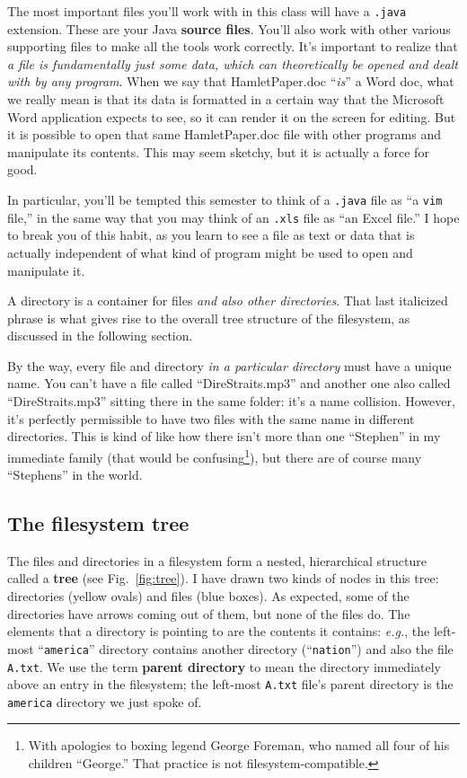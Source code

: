 The most important files you'll work with in this class will have a
\texttt{.java} extension. These are your Java \textbf{source files}. You'll
also work with other various supporting files to make all the tools work
correctly. It's important to realize that \textit{a file is fundamentally just
some data, which can theoretically be opened and dealt with by any program}.
When we say that HamletPaper.doc ``\textit{is}'' a Word doc, what we really
mean is that its data is formatted in a certain way that the Microsoft Word
application expects to see, so it can render it on the screen for editing. But
it is possible to open that same HamletPaper.doc file with other programs and
manipulate its contents. This may seem sketchy, but it is actually a force for
good.

In particular, you'll be tempted this semester to think of a \texttt{.java}
file as ``a \texttt{vim} file,'' in the same way that you may think of an
\texttt{.xls} file as ``an Excel file.'' I hope to break you of this habit, as
you learn to see a file as text or data that is actually independent of what
kind of program might be used to open and manipulate it.

A directory is a container for files \textit{and also other directories}. That
last italicized phrase is what gives rise to the overall tree structure of the
filesystem, as discussed in the following section.

By the way, every file and directory \textit{in a particular directory} must
have a unique name. You can't have a file called ``DireStraits.mp3'' and
another one also called ``DireStraits.mp3'' sitting there in the same folder:
it's a name collision. However, it's perfectly permissible to have two files
with the same name in different directories. This is kind of like how there
isn't more than one ``Stephen'' in my immediate family (that would be
confusing\footnote{With apologies to boxing legend George Foreman, who named
all four of his children ``George.'' That practice is not
filesystem-compatible.}), but there are of course many ``Stephens'' in the
world.

\subsection{The filesystem tree}

The files and directories in a filesystem form a nested, hierarchical
structure called a \textbf{tree} (see Fig.~\ref{fig:tree}). I have drawn two
kinds of nodes in this tree: directories (yellow ovals) and files (blue
boxes). As expected, some of the directories have arrows coming out of them,
but none of the files do. The elements that a directory is pointing to are the
contents it contains: \textit{e.g.}, the left-most ``\texttt{america}''
directory contains another directory (``\texttt{nation}'') and also the file
\texttt{A.txt}. We use the term \textbf{parent directory} to mean the
directory immediately above an entry in the filesystem; the left-most
\texttt{A.txt} file's parent directory is the \texttt{america} directory we
just spoke of.

